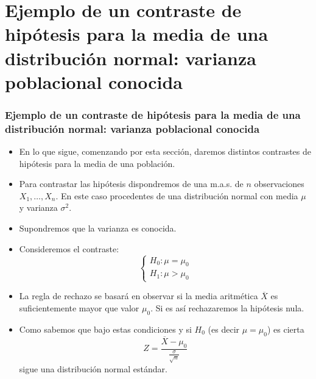 % 

    \section{Ejemplo de un  contraste de hipótesis para la media  de una
    distribución normal: varianza poblacional conocida}
\begin{frame}
    \frametitle{Ejemplo de un  contraste de hipótesis para la media  de una
    distribución normal: varianza poblacional conocida}

\begin{itemize}
\item En lo que sigue, comenzando por esta sección, daremos distintos contrastes de hipótesis para la media de una población.
\item Para contrastar las hipótesis dispondremos de una m.a.s. de $n$ observaciones $X_{1},\ldots,X_{n}$. En este caso procedentes de una distribución normal con media $\mu$ y varianza $\sigma^2$.
\item Supondremos que la varianza es conocida.
\item Consideremos el contraste:
    $$\left\{\begin{array}{l}
H_{0}:\mu=\mu_{0}\\ H_{1}:\mu>\mu_{0}
\end{array}
    \right.$$
\end{itemize}
\end{frame}

\begin{frame}
\begin{itemize}
\item La regla de rechazo se basará en observar si la media aritmética $\overline{X}$ es suficientemente mayor que valor $\mu_{0}$. Si es así rechazaremos la hipótesis nula.
\item Como sabemos que bajo estas condiciones y si $H_{0}$ (es decir
    $\mu=\mu_{0}$) es cierta
    $$Z=\frac{\overline{X}-\mu_{0}}{\frac{\sigma}{\sqrt{n}}}$$
    sigue una distribución normal estándar.
\end{itemize}
\end{frame}

